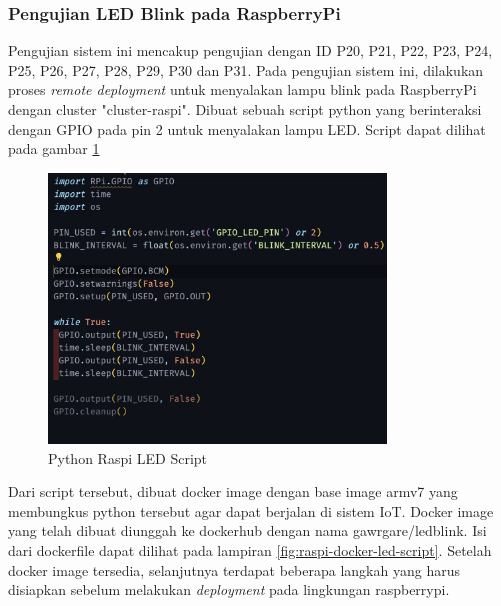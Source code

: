 \subsubsection{Pengujian LED Blink pada RaspberryPi}

Pengujian sistem ini mencakup pengujian dengan ID P20, P21, P22, P23, P24, P25, P26, P27, P28, P29, P30 dan P31. Pada pengujian sistem ini, dilakukan proses \textit{remote deployment} untuk menyalakan lampu blink pada RaspberryPi dengan cluster "cluster-raspi". Dibuat sebuah script python yang berinteraksi dengan GPIO pada pin 2 untuk menyalakan lampu LED. Script dapat dilihat pada gambar \ref{fig:raspi-python-led-script}

\begin{figure}[ht]
  \centering
  \includegraphics[width=0.8\textwidth]{resources/chapter-4/pengujian/pengujian-sistem-raspi-09-led.jpg}
  \caption{Python Raspi LED Script}
  \label{fig:raspi-python-led-script}
\end{figure}

Dari script tersebut, dibuat docker image dengan base image armv7 yang membungkus python tersebut agar dapat berjalan di sistem IoT. Docker image yang telah dibuat diunggah ke dockerhub dengan nama {gawrgare/led\textunderscore blink}. Isi dari dockerfile dapat dilihat pada lampiran \ref{fig:raspi-docker-led-script}. Setelah docker image tersedia, selanjutnya terdapat beberapa langkah yang harus disiapkan sebelum melakukan \textit{deployment} pada lingkungan raspberrypi.

